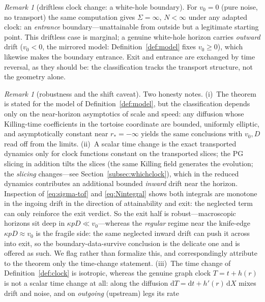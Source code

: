 \documentclass[11pt]{article}
\theoremstyle{definition}
\theoremstyle{remark}
\newtheorem{remark}[theorem]{Remark}
\newcommand{\dd}{\mathrm{d}}
\newcommand{\rstar}{r_{*}}
\begin{document}
\begin{remark}[driftless clock change: a white-hole boundary]
\label{rem:whitehole}
For $v_{0}=0$ (pure noise, no transport) the same computation gives
$\Sigma=\infty$, $N<\infty$ under any adapted clock: an
\emph{entrance} boundary---unattainable from outside but a legitimate
starting point. This driftless case is marginal; a genuine white-hole
horizon carries \emph{outward} drift ($v_{0}<0$, the mirrored model:
Definition~\ref{def:model} fixes $v_{0}\ge0$), which likewise makes
the boundary entrance. Exit and entrance are
exchanged by time reversal, as they should be: the classification
tracks the transport structure, not the geometry alone.
\end{remark}

\begin{remark}[robustness and the shift caveat]
\label{rem:shift}
Two honesty notes. (i)~The theorem is stated for the model of
Definition~\ref{def:model}, but the classification depends only on
the near-horizon asymptotics of scale and speed: any diffusion whose
Killing-time coefficients in the tortoise coordinate are bounded,
uniformly elliptic, and asymptotically constant near $\rstar=-\infty$
yields the same conclusions with $v_{0},D$ read off from the limits.
(ii)~A scalar time change is the exact transported dynamics only for
clock functions constant on the transported slices; the PG slicing in
addition tilts the slices (the same Killing field generates the
evolution; the \emph{slicing} changes---see
Section~\ref{subsec:whichclock}), which in the reduced dynamics
contributes an additional bounded \emph{inward} drift near the
horizon. Inspection of \eqref{eq:sigma-tof} and \eqref{eq:Nintegral}
shows both integrals are monotone in the ingoing drift in the
direction of attainability and exit: the neglected term can only
reinforce the exit verdict. So the exit half is robust---macroscopic
horizons sit deep in $\kappa pD\ll v_{0}$---whereas the \emph{regular}
regime near the knife-edge $\kappa pD\approx v_{0}$ is the fragile
side: the same neglected inward drift can push it across into exit, so
the boundary-data-survive conclusion is the delicate one and is
offered as such. We flag rather than formalize this,
and correspondingly attribute to the theorem only the time-change
statement. (iii)~The time change of Definition~\ref{def:clock} is
isotropic, whereas the genuine graph clock $T=t+h(r)$ is not a scalar
time change at all: along the diffusion $\dd T=\dd t+h'(r)\,\dd X$
mixes drift and noise, and on \emph{outgoing} (upstream) legs its rate

\end{remark}
\end{document}
